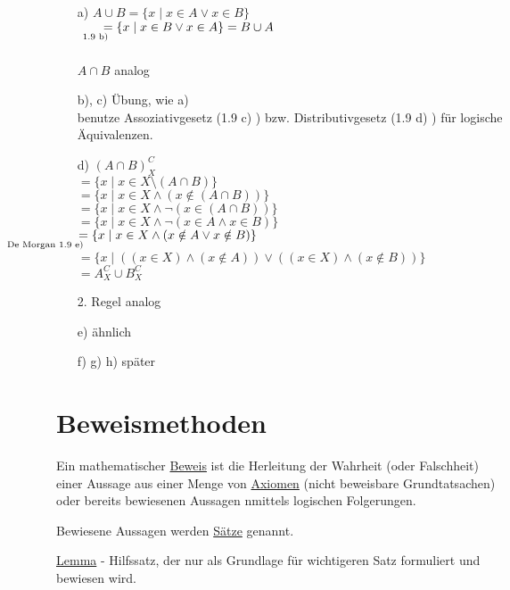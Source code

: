\documentclass[a4paper, 12pt, twoside] {article}
\begin{document}
\begin{itemize}
	\item[a)]
		$A \cup B = \{x \mid x \in A \lor x \in B\}$ \\
		$\qquad \underset{\mathllap{\text{1.9 b)}}}{=} \{x \mid x \in B \lor x \in A\} = B \cup A$ \\
		\hfill \\		
		$A \cap B$ analog
		
	\item[b), c)]
		Übung, wie a) \\
		benutze Assoziativgesetz (1.9 c) ) bzw. Distributivgesetz (1.9 d) ) für logische Äquivalenzen.
		
	\item[d)]
		$(A \cap B)^C_X$ \\
		$ = \{x \mid x \in X \setminus (A \cap B) \}$ \\
		$ = \{x \mid x \in X \land (x \notin (A \cap B)) \}$ \\
		$ = \{x \mid x \in X \land \neg (x \in (A \cap B)) \}$ \\
		$ = \{x \mid x \in X \land \neg (x \in A \land x \in B) \}$ \\
		$ \underset{\mathllap{\text{De Morgan 1.9 e)}}}{=} \{x \mid x \in X \land (x \notin A \lor x \notin B)\}$ \\
		$ = \{x \mid ((x \in X) \land (x \notin A)) \lor ((x \in X) \land (x \notin B)) \}$ \\
		$ = A^C_X \cup B^C_X$
		
		2. Regel analog
		
	\item[e)]
		ähnlich
	\item[f) g) h)]
		später
\end{itemize}

\section{Beweismethoden}

Ein mathematischer \underline{Beweis} ist die Herleitung der Wahrheit (oder Falschheit) einer Aussage aus einer Menge von \underline{Axiomen} (nicht beweisbare Grundtatsachen) oder bereits bewiesenen Aussagen nmittels logischen Folgerungen.

Bewiesene Aussagen werden \underline{Sätze} genannt.

\hfill

\underline{Lemma} - Hilfssatz, der nur als Grundlage für wichtigeren Satz formuliert und bewiesen wird.
\end{document}

